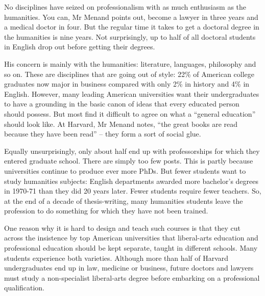 \begin{listmatch}
	\item
No disciplines have seized on professionalism with as much
enthusiasm as the humanities. You can, Mr Menand points out, become a
lawyer in three years and a medical doctor in four. But the regular time
it takes to get a doctoral degree in the humanities is nine years. Not
surprisingly, up to half of all doctoral students in English drop out
before getting their degrees.


\item 
His concern is mainly with the humanities: literature,
languages, philosophy and so on. These are disciplines that are going
out of style: 22\% of American college graduates now major in business
compared with only 2\% in history and 4\% in English. However, many
leading American universities want their undergraduates to have a
grounding in the basic canon of ideas that every educated person should
possess. But most find it difficult to agree on what a ``general
education'' should look like. At Harvard, Mr Menand notes, ``the great
books are read because they have been read'' -- they form a sort of
social glue.


\item 
Equally unsurprisingly, only about half end up with
professorships for which they entered graduate school. There are simply
too few posts. This is partly because universities continue to produce
ever more PhDs. But fewer students want to study humanities subjects:
English departments awarded more bachelor's degrees in 1970-71 than they
did 20 years later. Fewer students require fewer teachers. So, at the
end of a decade of thesis-writing, many humanities students leave the
profession to do something for which they have not been trained.


\item 
One reason why it is hard to design and teach such courses is
that they cut across the insistence by top American universities that
liberal-arts education and professional education should be kept
separate, taught in different schools. Many students experience both
varieties. Although more than half of Harvard undergraduates end up in
law, medicine or business, future doctors and lawyers must study a
non-specialist liberal-arts degree before embarking on a professional
qualification.



\end{listmatch}
